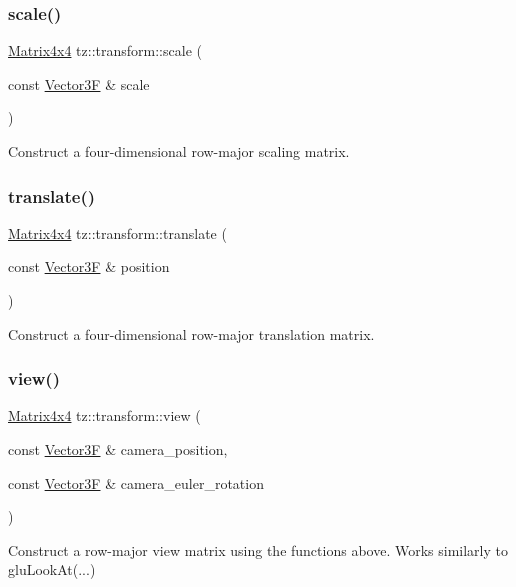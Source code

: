 \subsubsection{\texorpdfstring{scale()}{scale()}}
{\footnotesize\ttfamily \mbox{\hyperlink{class_matrix4x4}{Matrix4x4}} tz\+::transform\+::scale (\begin{DoxyParamCaption}\item[{const \mbox{\hyperlink{class_vector3}{Vector3F}} \&}]{scale }\end{DoxyParamCaption})}

Construct a four-\/dimensional row-\/major scaling matrix. \mbox{\label{namespacetz_1_1transform_aaf7c616e2645fda6e6e38899bfd52119}} 
\subsubsection{\texorpdfstring{translate()}{translate()}}
{\footnotesize\ttfamily \mbox{\hyperlink{class_matrix4x4}{Matrix4x4}} tz\+::transform\+::translate (\begin{DoxyParamCaption}\item[{const \mbox{\hyperlink{class_vector3}{Vector3F}} \&}]{position }\end{DoxyParamCaption})}

Construct a four-\/dimensional row-\/major translation matrix. \mbox{\label{namespacetz_1_1transform_af50903633804f4488c75cfc54d5100dc}} 
\subsubsection{\texorpdfstring{view()}{view()}}
{\footnotesize\ttfamily \mbox{\hyperlink{class_matrix4x4}{Matrix4x4}} tz\+::transform\+::view (\begin{DoxyParamCaption}\item[{const \mbox{\hyperlink{class_vector3}{Vector3F}} \&}]{camera\+\_\+position,  }\item[{const \mbox{\hyperlink{class_vector3}{Vector3F}} \&}]{camera\+\_\+euler\+\_\+rotation }\end{DoxyParamCaption})}

Construct a row-\/major view matrix using the functions above. Works similarly to glu\+Look\+At(...) 